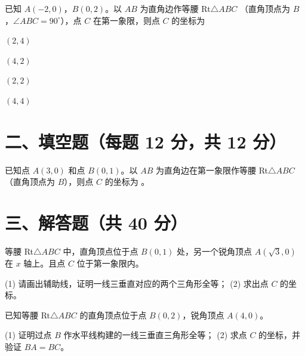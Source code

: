 \documentclass{exam-zh}
\newcommand{\answerarea}[1][40mm]{%
  \vspace{2mm}%
  \begin{tcolorbox}[
    enhanced, breakable,
    colback=white,
    colframe=white,
    boxrule=0pt,
    height=#1,
    valign=top,
    bottom=0mm,
    after skip=0mm,
  ]
  \end{tcolorbox}%
}
\begin{document}
\begin{question}[points=12]
  已知 $A(-2, 0)$，$B(0, 2)$。以 $AB$ 为直角边作等腰 Rt$\triangle ABC$ （直角顶点为 $B$，$\angle ABC = 90^\circ$），点 $C$ 在第一象限，则点 $C$ 的坐标为
  \begin{choices}
    \item $(2, 4)$
    \item $(4, 2)$
    \item $(2, 2)$
    \item $(4, 4)$
  \end{choices}
\end{question}


\section*{二、填空题（每题 12 分，共 12 分）}


\begin{question}[points=12]
  已知点 $A(3, 0)$ 和点 $B(0, 1)$。以 $AB$ 为直角边在第一象限作等腰 Rt$\triangle ABC$ （直角顶点为 $B$），则点 $C$ 的坐标为 \fillin。
\end{question}


\section*{三、解答题（共 40 分）}


\begin{problem}[points=20]
  等腰 Rt$\triangle ABC$ 中，直角顶点位于点 $B(0, 1)$ 处，另一个锐角顶点 $A(\sqrt{3}, 0)$ 在 $x$ 轴上。且点 $C$ 位于第一象限内。

(1) 请画出辅助线，证明一线三垂直对应的两个三角形全等；
(2) 求出点 $C$ 的坐标。
  \answerarea[60mm]
\end{problem}



\begin{problem}[points=20]
  已知等腰 Rt$\triangle ABC$ 的直角顶点位于点 $B(0, 2)$，锐角顶点 $A(4, 0)$。

(1) 证明过点 $B$ 作水平线构建的一线三垂直三角形全等；
(2) 求点 $C$ 的坐标，并验证 $BA = BC$。
  \answerarea[55mm]
\end{problem}
\end{document}
